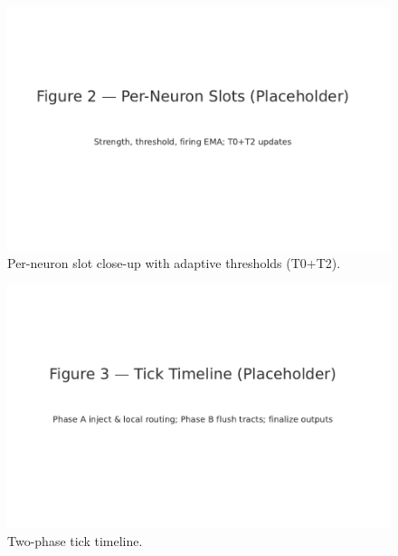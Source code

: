 \begin{figure}[t]
  \centering
  \includegraphics[width=0.85\linewidth]{figures/fig_slot_closeup.pdf}
  \caption{Per-neuron slot close-up with adaptive thresholds (T0+T2).}
  \label{fig:slot}
\end{figure}

\begin{figure}[t]
  \centering
  \includegraphics[width=0.95\linewidth]{figures/fig_tick_timeline.pdf}
  \caption{Two-phase tick timeline.}
  \label{fig:timeline}
\end{figure}
